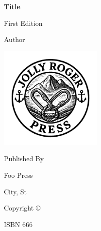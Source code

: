 \setcounter{page}{-1}

\thispagestyle{empty}

\begin{figure}[p] %
\end{figure}
\restoregeometry %

\thispagestyle{empty}

\frontmatter
\begin{titlepage}
    \thispagestyle{empty}
    \begin{center}
        \LARGE
        \textbf{Title}
        
        \vspace*{1.5in}
        \Large
        First Edition
        
        \vspace*{1.5in}
        \Large
        Author
        
        \vspace*{\fill}
        \includegraphics[width=2in]{jr_press.png}
    \end{center}
    \newpage
    \thispagestyle{empty}
    \begin{center}
        \vspace*{\fill}
        Published By
        
        Foo Press
        
        City, St
        
        Copyright \copyright{}

        ISBN 666
    \end{center}
\end{titlepage}

\thispagestyle{empty}
\tableofcontents
\thispagestyle{empty}
